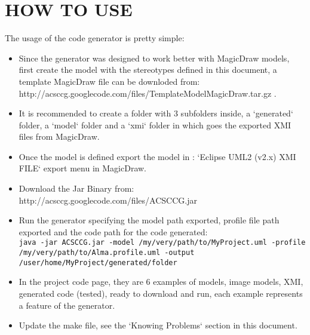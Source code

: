 \section{HOW TO USE}

The usage of the code generator is pretty simple:

\begin{itemize}
\item Since the generator was designed to work better with MagicDraw models,
first create the model with the stereotypes defined in this document, a template
MagicDraw file can be downloded from:\\
http://acsccg.googlecode.com/files/TemplateModelMagicDraw.tar.gz .
\item It is recommended to create a folder with 3 subfolders inside, a
`generated` folder, a `model` folder and a `xmi` folder in which goes the
exported XMI files from MagicDraw.
\item Once the model is defined export the model in : `Eclipse UML2 (v2.x) XMI
FILE` export menu in MagicDraw.
\item Download the Jar Binary from:\\
http://acsccg.googlecode.com/files/ACSCCG.jar
\item Run the generator specifying the model path exported, profile file path
exported and the code path for the code generated:\\ 
\verb+java -jar ACSCCG.jar -model /my/very/path/to/MyProject.uml -profile /my/very/path/to/Alma.profile.uml -output /user/home/MyProject/generated/folder+
\item In the project code page, they are 6 examples of models, image models,
XMI, generated code (tested), ready to download and run, each example represents
a feature of the generator.
\item Update the make file, see the `Knowing Problems` section in this document.
\end{itemize}

